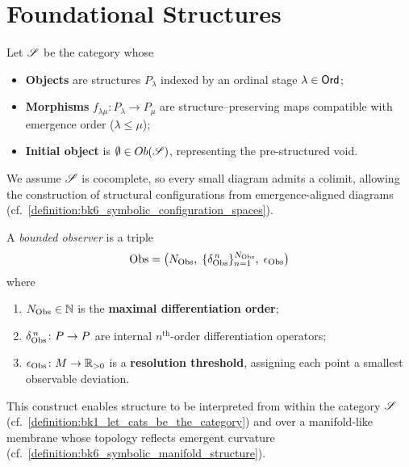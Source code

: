 \section{Foundational Structures}
\label{sec:bk1_foundational_structures}
\begin{definition}
\label{definition:bk1_let_cats_be_the_category}
Let \(\mathscr{S}\) be the category whose
\begin{itemize}
  \item \textbf{Objects} are structures \(P_\lambda\) indexed by an ordinal stage \(\lambda \in \mathsf{Ord}\);
  \item \textbf{Morphisms} \(f_{\lambda\mu}\colon P_\lambda \to P_\mu\) are structure–preserving maps compatible with emergence order (\(\lambda \le \mu\));
  \item \textbf{Initial object} is \(\emptyset \in Ob(\mathscr{S})\), representing the pre-structured void.
\end{itemize}
We assume \(\mathscr{S}\) is cocomplete, so every small diagram admits a colimit, allowing the construction of structural configurations from emergence-aligned diagrams (cf.~\ref{definition:bk6_symbolic_configuration_spaces}). \qedhere
\end{definition}
\vspace{1.2em}
\begin{definition}
\label{definition:bk1_bounded_observer}
A \emph{bounded observer} is a triple
\[
\mathrm{Obs} = \bigl(N_{\mathrm{Obs}},\;\{\delta_{\mathrm{Obs}}^{\,n}\}_{n=1}^{N_{\mathrm{Obs}}},\;\epsilon_{\mathrm{Obs}}\bigr)
\]
where
\begin{enumerate}[label=(\roman*)]
  \item \(N_{\mathrm{Obs}} \in \mathbb{N}\) is the \textbf{maximal differentiation order};
  \item \(\delta_{\mathrm{Obs}}^{\,n}\colon P \to P\) are internal \(n^{\text{th}}\)-order differentiation operators;
  \item \(\epsilon_{\mathrm{Obs}}\colon M \to \mathbb{R}_{>0}\) is a \textbf{resolution threshold}, assigning each point a smallest observable deviation.
\end{enumerate}
This construct enables structure to be interpreted from within the category \(\mathscr{S}\) (cf.~\ref{definition:bk1_let_cats_be_the_category}) and over a manifold-like membrane whose topology reflects emergent curvature (cf.~\ref{definition:bk6_symbolic_manifold_structure}).
\end{definition}

